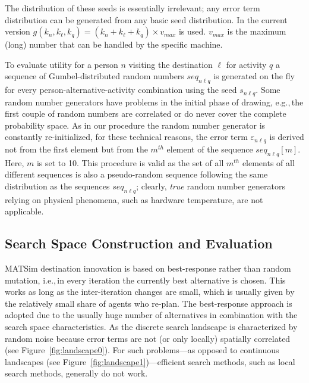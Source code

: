 The distribution of these seeds is essentially irrelevant; any error term distribution can be generated from any basic seed distribution. 
In the current version $g(k_n, k_\ell, k_q) = (k_n + k_\ell + k_q) \times v_{max}$ is used. $v_{max}$ is the maximum (long) number that can be handled by the specific machine.

To evaluate utility for a person $n$ visiting the destination $\ell$ for activity $q$ a sequence of Gumbel-distributed random numbers $seq_{n\ell q}$ is generated on the fly for every person-alternative-activity combination using the seed $s_{n\ell q}$. Some random number generators have problems in the initial phase of drawing, e.g.,\,the first couple of random numbers are correlated or do never cover the complete probability space. As in our procedure the random number generator is constantly re-initialized, for these technical reasons, the error term $\varepsilon_{n\ell q}$ is derived not from the first element but from the $m^{th}$ element of the sequence $seq_{n\ell q}[m]$. Here, $m$ is set to 10. This procedure is valid as the set of all  $m^{th}$ elements of all different sequences is also a pseudo-random sequence following the same distribution as the sequences $seq_{n\ell q}$; clearly, \emph{true} random number generators relying on physical phenomena, such as hardware temperature, are not applicable. 

\subsection{Search Space Construction and Evaluation}
MATSim destination innovation is based on best-response rather than random mutation, i.e.,\,in every iteration the currently best alternative is chosen. This works as long as the inter-iteration changes are small, which is usually given by the relatively small share of agents who re-plan. The best-response approach is adopted due to the usually huge number of alternatives in combination with the search space characteristics. As the discrete search landscape is characterized by random noise because error terms are not (or only locally) spatially correlated (see Figure~\ref{fig:landscape0}). For such problems---as opposed to continuous landscapes (see Figure~\ref{fig:landscape1})---efficient search methods, such as local search methods, generally do not work.

